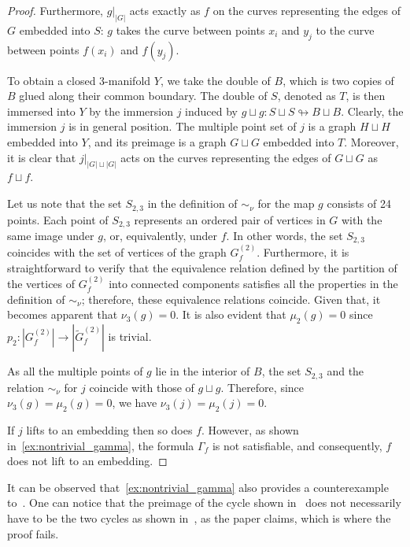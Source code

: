 \documentclass[a4paper,12pt,reqno,oneside]{amsart}
\theoremstyle{plain}
\theoremstyle{definition}
\theoremstyle{plain}
\newcommand{\from}{\colon}
\newcommand{\wt}[1]{\widetilde{#1}}
\begin{document}
\begin{proof}
  Furthermore, $g\big|_{|G|}$ acts exactly as $f$ on the curves representing the edges of $G$
  embedded into $S$: $g$ takes the curve between points $x_i$ and $y_j$ to the curve between points
  $f(x_i)$ and $f(y_j)$.

  To obtain a closed 3-manifold $Y$, we take the double of $B$, which is two copies of $B$ glued
  along their common boundary. The double of $S$, denoted as $T$, is then immersed into $Y$ by the
  immersion $j$ induced by $g \sqcup g \from S \sqcup S \looparrowright B \sqcup B$. Clearly, the
  immersion $j$ is in general position. The multiple point set of $j$ is a graph $H \sqcup H$
  embedded into $Y$, and its preimage is a graph $G \sqcup G$ embedded into $T$. Moreover, it is
  clear that $j\big|_{|G| \sqcup |G|}$ acts on the curves representing the edges of $G \sqcup G$ as
  $f \sqcup f$.

  Let us note that the set $S_{2,3}$ in the definition of $\sim_\nu$ for the map $g$ consists of 24
  points. Each point of $S_{2,3}$ represents an ordered pair of vertices in $G$ with the same image
  under $g$, or, equivalently, under $f$. In other words, the set $S_{2,3}$ coincides with the set
  of vertices of the graph $G_f^{(2)}$. Furthermore, it is straightforward to verify that the
  equivalence relation defined by the partition of the vertices of $G_f^{(2)}$ into connected
  components satisfies all the properties in the definition of $\sim_\nu$; therefore, these
  equivalence relations coincide. Given that, it becomes apparent that $\nu_3(g) = 0$. It is also
  evident that $\mu_2(g) = 0$ since $p_2 \from |G_f^{(2)}| \to |\wt{G}_f^{(2)}|$ is trivial.

  As all the multiple points of $g$ lie in the interior of $B$, the set $S_{2,3}$ and the relation
  $\sim_\nu$ for $j$ coincide with those of $g \sqcup g$. Therefore, since
  $\nu_3(g) = \mu_2(g) = 0$, we have $\nu_3(j) = \mu_2(j) = 0$.

  If $j$ lifts to an embedding then so does $f$. However, as shown in~\cref{ex:nontrivial_gamma},
  the formula $\Gamma_f$ is not satisfiable, and consequently, $f$ does not lift to an embedding.
\end{proof}

It can be observed that~\cref{ex:nontrivial_gamma} also provides a
counterexample to~\cite[Lemme 1.7]{poen_fr}. One can notice that the preimage of the cycle
shown in~\cite[Fig. 1.3]{poen_fr} does not necessarily have to be the two cycles as
shown in~\cite[Fig. 1.4]{poen_fr}, as the paper claims, which is where the proof fails.
\end{document}

